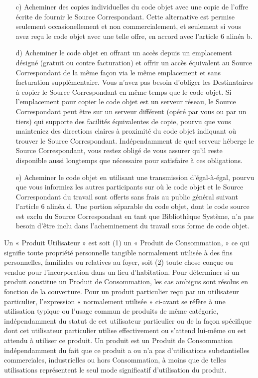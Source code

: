 {\begin{enumerate}
\item [c)]  Acheminer des copies individuelles du code objet avec une copie de
     l’offre écrite de fournir le Source Correspondant. Cette
     alternative est permise seulement occasionellement et non
     commercialement, et seulement si vous avez reçu le code objet avec
     une telle offre, en accord avec l’article 6 alinéa b.

\item [d)]  Acheminer le code objet en offrant un accès depuis un emplacement
     désigné (gratuit ou contre facturation) et offrir un accès
     équivalent au Source Correspondant de la même façon via le même
     emplacement et sans facturation supplémentaire. Vous n’avez pas
     besoin d’obliger les Destinataires à copier le Source
     Correspondant en même temps que le code objet. Si l’emplacement
     pour copier le code objet est un serveur réseau, le Source
     Correspondant peut être sur un serveur différent (opéré par vous
     ou par un tiers) qui supporte des facilités équivalentes de
     copie, pourvu que vous mainteniez des directions claires à
     proximité du code objet indiquant où trouver le Source
     Correspondant. Indépendamment de quel serveur héberge le Source
     Correspondant, vous restez obligé de vous assurer qu’il reste
     disponible aussi longtemps que nécessaire pour satisfaire à ces
     obligations.

\item [e)]  Acheminer le code objet en utilisant une transmission
     d’égal-à-égal, pourvu que vous informiez les autres participants
     sur où le code objet et le Source Correspondant du travail sont
     offerts sans frais au public général suivant l’article 6 alinéa d.
     Une portion séparable du code objet, dont le code source est exclu
     du Source Correspondant en tant que Bibliothèque Système, n’a pas
     besoin d’être inclu dans l’acheminement du travail sous forme de
     code objet.
\end{enumerate}

Un « Produit Utilisateur » est soit (1) un « Produit de Consommation, »
ce qui signifie toute propriété personnelle tangible normalement
utilisée à des fins personnelles, familiales ou relatives au foyer,
soit (2) toute chose conçue ou vendue pour l’incorporation dans un lieu
d’habitation. Pour déterminer si un produit constitue un Produit de
Consommation, les cas ambigus sont résolus en fonction de la
couverture. Pour un produit particulier reçu par un utilisateur
particulier, l’expression « normalement utilisée » ci-avant se réfère
à une utilisation typique ou l’usage commun de produits de même
catégorie, indépendamment du statut de cet utilisateur particulier ou
de la façon spécifique dont cet utilisateur particulier utilise
effectivement ou s’attend lui-même ou est attendu à utiliser ce
produit. Un produit est un Produit de Consommation indépendamment du
fait que ce produit a ou n’a pas d’utilisations substantielles
commerciales, industrielles ou hors Consommation, à moins que de telles
utilisations représentent le seul mode significatif d’utilisation du
produit.

}
